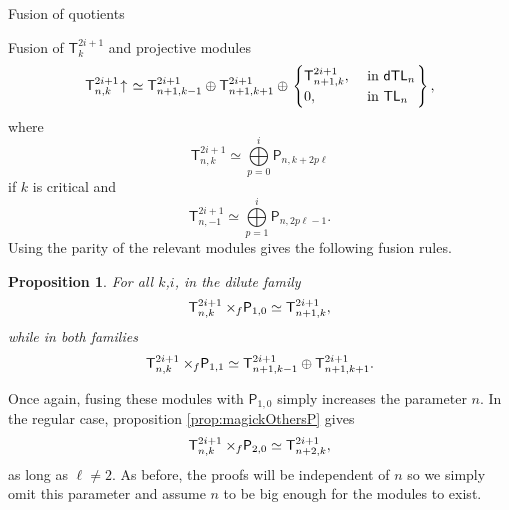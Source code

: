 \documentclass[reqno]{amsart}
\newtheorem{Prop}[Thm]{Proposition}
\newcommand{\dtl}[1]{\mathsf{dTL}_{#1}}
\newcommand{\tl}[1]{\mathsf{TL}_{#1}}
\newcommand{\dP}[1]{\mathsf P_{#1}}
\newcommand{\xf}{\times\hspace{-0.27em}_f}
\newcommand{\T}[2]{\mathsf{T}^{#1}_{#2}}
\newcommand{\lc}{\ell}
\newcommand{\Ind}[1]{#1{}\hspace{-0.18em} \uparrow{}\hskip -0.18em}
\begin{document}
\begin{section}{Fusion of quotients}
\begin{subsection}{Fusion of $\T{2i+1}{k}$ and projective modules}
\begin{equation}
	\Ind{\T{2i+1}{n,k}} \simeq \T{2i+1}{n+1,k-1}  \oplus \T{2i+1}{n+1,k+1}\oplus \left. \begin{cases}
	\T{2i+1}{n+1,k}, & \text{ in } \dtl{n}\\
	0, & \text{ in } \tl{n}
	\end{cases}\right\},
\end{equation}
where 
\begin{equation}
	\T{2i+1}{n,k} \simeq \overset{i}{\underset{p=0}{\bigoplus}} \dP{n,k+2p\lc}
\end{equation}
if $k$ is critical and
\begin{equation}
	\T{2i+1}{n,-1} \simeq \overset{i}{\underset{p=1}{\bigoplus}} \dP{n,2p\lc-1}.
\end{equation}
Using the parity of the relevant modules gives the following fusion rules.
\begin{Prop}\label{prop:fusionTvs01}
For all $k$,$i$, in the dilute family
\begin{equation}
	\T{2i+1}{n,k}\xf\dP{1,0} \simeq \T{2i+1}{n+1,k},
\end{equation}
while in both families
\begin{equation}
	\T{2i+1}{n,k} \xf \dP{1,1} \simeq \T{2i+1}{n+1,k-1} \oplus \T{2i+1}{n+1,k+1}.
\end{equation} 
\end{Prop}
Once again, fusing these modules with $\dP{1,0}$ simply increases the parameter $n$. In the regular case, proposition \ref{prop:magickOthersP} gives $$\T{2i+1}{n,k} \xf \dP{2,0} \simeq \T{2i+1}{n+2,k}, $$ as long as $\lc \neq 2$. As before, the proofs will be independent of $n$ so we simply omit this parameter and assume $n$ to be big enough for the modules to exist. 


\end{subsection}
\end{section}
\end{document}
